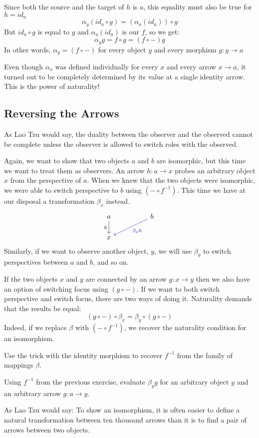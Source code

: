 \documentclass[DaoFP]{subfiles}
\begin{document}
Since both the source and the target of $h$ is $a$, this equality must also be true for $h = id_a$
\[\alpha_y (id_a \circ g) = (\alpha_a (id_a)) \circ g \]
But $id_a \circ g$ is equal to $g$ and $\alpha_a(id_a)$ is our $f$, so we get:
\[\alpha_y g = f \circ g = (f \circ -) g\]
In other words, $\alpha_y = (f \circ -)$ for every object $y$ and every morphism $g \colon y \to a$

Even though $\alpha_x$ was defined individually for every $x$ and every arrow $x \to a$, it turned out to be completely determined by its value at a single identity arrow. This is the power of naturality!
\subsection{Reversing the Arrows}
As Lao Tzu would say, the duality between the observer and the observed cannot be complete unless the observer is allowed to switch roles with the observed. 

Again, we want to show that two objects $a$ and $b$ are isomorphic, but this time we want to treat them as observers. An arrow $h \colon a \to x$ probes an arbitrary object $x$ from the perspective of $a$. When we knew that the two objects were isomorphic, we were able to switch perspective to $b$ using $(- \circ f^{-1})$. This time we have at our disposal a transformation $\beta_x$ instead.
\[
 \begin{tikzcd}
 a
 \arrow[d, "h"']
 && b
 \arrow[lld, blue, "\beta_x h"]
 \\
 x
  \end{tikzcd}
\]
Similarly, if we want to observe another object, $y$, we will use $\beta_y$ to switch perspectives between $a$ and $b$, and so on. 

If the two objects $x$ and $y$ are connected by an arrow $g \colon x \to y$ then we also have an option of switching focus using $(g \circ -)$. If we want to both switch perspective and switch focus, there are two ways of doing it. Naturality demands that the results be equal:
\[ (g \circ -) \circ \beta_x = \beta_y \circ (g \circ -) \]
Indeed, if we replace $\beta$ with $(- \circ f^{-1})$, we recover the naturality condition for an isomorphism. 

\begin{exercise}
Use the trick with the identity morphism to recover $f^{-1}$ from the family of mappings $\beta$.
\end{exercise}
\begin{exercise}
Using $f^{-1}$ from the previous exercise, evaluate $\beta_y g$ for an arbitrary object $y$ and an arbitrary arrow $g \colon a \to y$.
\end{exercise}


As Lao Tzu would say: To show an isomorphism, it is often easier to define a natural transformation between ten thousand arrows than it is to find a pair of arrows between two objects.
\end{document}
